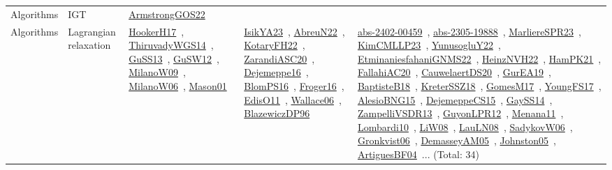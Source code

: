 {\begin{longtable}{lp{3cm}>{\raggedright\arraybackslash}p{6cm}>{\raggedright\arraybackslash}p{6cm}>{\raggedright\arraybackslash}p{8cm}}
Algorithms & IGT & \href{../works/ArmstrongGOS22.pdf}{ArmstrongGOS22}~\cite{ArmstrongGOS22} &  & \\
Algorithms & Lagrangian relaxation & \href{../works/HookerH17.pdf}{HookerH17}~\cite{HookerH17}, \href{../works/ThiruvadyWGS14.pdf}{ThiruvadyWGS14}~\cite{ThiruvadyWGS14}, \href{../works/GuSS13.pdf}{GuSS13}~\cite{GuSS13}, \href{../works/GuSW12.pdf}{GuSW12}~\cite{GuSW12}, \href{../works/MilanoW09.pdf}{MilanoW09}~\cite{MilanoW09}, \href{../works/MilanoW06.pdf}{MilanoW06}~\cite{MilanoW06}, \href{../works/Mason01.pdf}{Mason01}~\cite{Mason01} & \href{../works/IsikYA23.pdf}{IsikYA23}~\cite{IsikYA23}, \href{../works/AbreuN22.pdf}{AbreuN22}~\cite{AbreuN22}, \href{../works/KotaryFH22.pdf}{KotaryFH22}~\cite{KotaryFH22}, \href{../works/ZarandiASC20.pdf}{ZarandiASC20}~\cite{ZarandiASC20}, \href{../works/Dejemeppe16.pdf}{Dejemeppe16}~\cite{Dejemeppe16}, \href{../works/BlomPS16.pdf}{BlomPS16}~\cite{BlomPS16}, \href{../works/Froger16.pdf}{Froger16}~\cite{Froger16}, \href{../works/EdisO11.pdf}{EdisO11}~\cite{EdisO11}, \href{../works/Wallace06.pdf}{Wallace06}~\cite{Wallace06}, \href{../works/BlazewiczDP96.pdf}{BlazewiczDP96}~\cite{BlazewiczDP96} & \href{../works/abs-2402-00459.pdf}{abs-2402-00459}~\cite{abs-2402-00459}, \href{../works/abs-2305-19888.pdf}{abs-2305-19888}~\cite{abs-2305-19888}, \href{../works/MarliereSPR23.pdf}{MarliereSPR23}~\cite{MarliereSPR23}, \href{../works/KimCMLLP23.pdf}{KimCMLLP23}~\cite{KimCMLLP23}, \href{../works/YunusogluY22.pdf}{YunusogluY22}~\cite{YunusogluY22}, \href{../works/EtminaniesfahaniGNMS22.pdf}{EtminaniesfahaniGNMS22}~\cite{EtminaniesfahaniGNMS22}, \href{../works/HeinzNVH22.pdf}{HeinzNVH22}~\cite{HeinzNVH22}, \href{../works/HamPK21.pdf}{HamPK21}~\cite{HamPK21}, \href{../works/FallahiAC20.pdf}{FallahiAC20}~\cite{FallahiAC20}, \href{../works/CauwelaertDS20.pdf}{CauwelaertDS20}~\cite{CauwelaertDS20}, \href{../works/GurEA19.pdf}{GurEA19}~\cite{GurEA19}, \href{../works/BaptisteB18.pdf}{BaptisteB18}~\cite{BaptisteB18}, \href{../works/KreterSSZ18.pdf}{KreterSSZ18}~\cite{KreterSSZ18}, \href{../works/GomesM17.pdf}{GomesM17}~\cite{GomesM17}, \href{../works/YoungFS17.pdf}{YoungFS17}~\cite{YoungFS17}, \href{../works/AlesioBNG15.pdf}{AlesioBNG15}~\cite{AlesioBNG15}, \href{../works/DejemeppeCS15.pdf}{DejemeppeCS15}~\cite{DejemeppeCS15}, \href{../works/GaySS14.pdf}{GaySS14}~\cite{GaySS14}, \href{../works/ZampelliVSDR13.pdf}{ZampelliVSDR13}~\cite{ZampelliVSDR13}, \href{../works/GuyonLPR12.pdf}{GuyonLPR12}~\cite{GuyonLPR12}, \href{../works/Menana11.pdf}{Menana11}~\cite{Menana11}, \href{../works/Lombardi10.pdf}{Lombardi10}~\cite{Lombardi10}, \href{../works/LiW08.pdf}{LiW08}~\cite{LiW08}, \href{../works/LauLN08.pdf}{LauLN08}~\cite{LauLN08}, \href{../works/SadykovW06.pdf}{SadykovW06}~\cite{SadykovW06}, \href{../works/Gronkvist06.pdf}{Gronkvist06}~\cite{Gronkvist06}, \href{../works/DemasseyAM05.pdf}{DemasseyAM05}~\cite{DemasseyAM05}, \href{../works/Johnston05.pdf}{Johnston05}~\cite{Johnston05}, \href{../works/ArtiguesBF04.pdf}{ArtiguesBF04}~\cite{ArtiguesBF04}... (Total: 34)\\

\end{longtable}}
